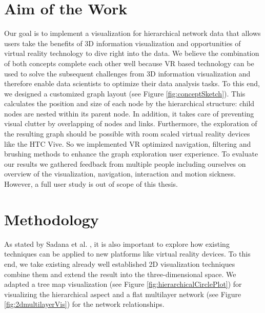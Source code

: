 \section{Aim of the Work}

Our goal is to implement a visualization for hierarchical network data that allows users take the benefits of 3D information visualization and opportunities of virtual reality technology to dive right into the data. We believe the combination of both concepts complete each other well because VR based technology can be used to solve the subsequent challenges from 3D information visualization and therefore enable data scientists to optimize their data analysis tasks. 
To this end, we designed a customized graph layout (see Figure \ref{fig:conceptSketch}).
This calculates the position and size of each node by the hierarchical structure: child nodes are nested within its parent node. In addition, it takes care of preventing visual clutter by overlapping of nodes and links. 
Furthermore, the exploration of the resulting graph should be possible with room scaled virtual reality devices like the HTC Vive. So we implemented VR optimized navigation, filtering and brushing methods to enhance the graph exploration user experience. 
To evaluate our results we gathered feedback from multiple people including ourselves on overview of the visualization, navigation, interaction and motion sickness. However, a full user study is out of scope of this thesis.

\section{Methodology}
As stated by Sadana et al. \cite{sadana_redefining_2016}, it is also important to explore how existing techniques can be applied to new platforms like virtual reality devices. To this end, we take existing already well established 2D visualization techniques combine them and extend the result into the three-dimensional space. We adapted a tree map visualization (see Figure \ref{fig:hierarchicalCirclePlot}) for visualizing the hierarchical aspect and a flat multilayer network (see Figure \ref{fig:2dmultilayerVis}) for the network relationships.  

